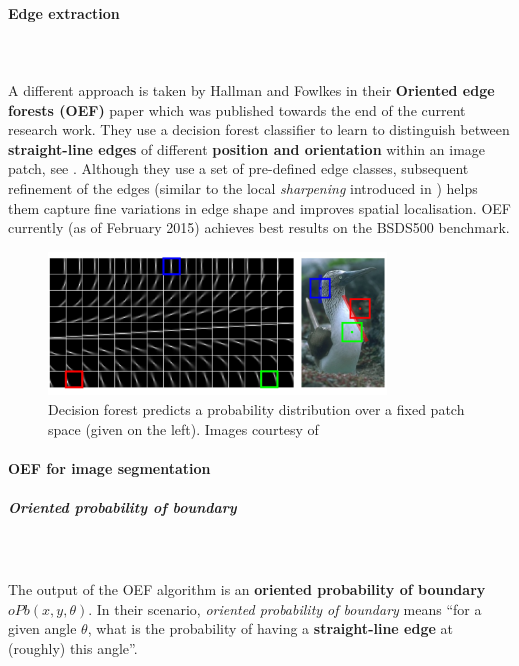 \paragraph{Edge extraction}\mbox{}\\\mbox{}\\
A different approach is taken by Hallman and Fowlkes in their \textbf{Oriented edge forests (OEF)} paper \cite{Hallman2014} which was published towards the end of the current research work. They use a decision forest classifier to learn to distinguish between {\bf straight-line edges} of different {\bf position and orientation} within an image patch, see . Although they use a set of pre-defined edge classes, subsequent refinement of the edges (similar to the local {\it sharpening} introduced in \cite{Dollar2015PAMI}) %
helps them capture fine variations in edge shape and improves spatial localisation. OEF currently (as of February 2015) achieves best results on the BSDS500 benchmark.

\begin{figure}[ht!]
\centering
\includegraphics[width=0.8\textwidth]{images/OEF-oriented-patch-space.png} %
\caption{Decision forest predicts a probability distribution over a fixed patch space (given on the left). Images courtesy of~\cite{Hallman2014}}
\label{fig:OEF-oriented-patch-space}
\end{figure}

\paragraph{OEF for image segmentation}
\subparagraph{Oriented probability of boundary}\mbox{}\\\mbox{}\\
The output of the OEF algorithm is an {\bf oriented probability of boundary} %
$oPb(x,y,\theta)$. In their scenario, {\it oriented probability of boundary} means ``for a given angle $\theta$, what is the probability of having a {\bf straight-line edge} at (roughly) this angle''.

